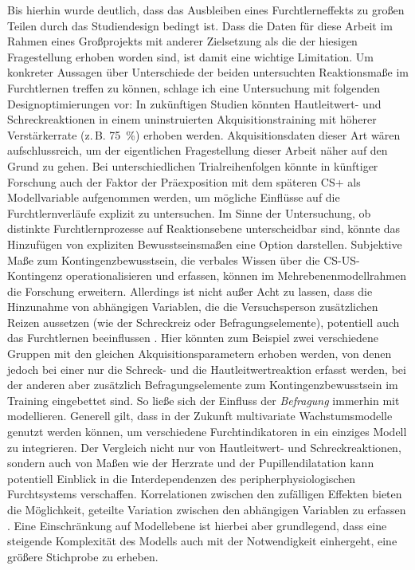 	Bis hierhin wurde deutlich, dass das Ausbleiben eines Furchtlerneffekts zu großen Teilen durch das Studiendesign bedingt ist. 
	Dass die Daten für diese Arbeit im Rahmen eines Großprojekts mit anderer Zielsetzung als die der hiesigen Fragestellung erhoben worden sind, ist damit eine wichtige Limitation. 
	Um konkreter Aussagen über Unterschiede der beiden untersuchten Reaktionsmaße im Furchtlernen treffen zu können, schlage ich eine Untersuchung mit folgenden Designoptimierungen vor: 
	In zukünftigen Studien könnten Hautleitwert- und Schreckreaktionen in einem uninstruierten Akquisitionstraining mit höherer Verstärkerrate (z.\,B. \SI{75}{\percent}) erhoben werden. 
	Akquisitionsdaten dieser Art wären aufschlussreich, um der eigentlichen Fragestellung dieser Arbeit näher auf den Grund zu gehen.
	Bei unterschiedlichen Trialreihenfolgen könnte in künftiger Forschung auch der Faktor der Präexposition mit dem späteren CS+ als Modellvariable  aufgenommen werden, um mögliche Einflüsse auf die Furchtlernverläufe explizit zu untersuchen.
	Im Sinne der Untersuchung, ob distinkte Furchtlernprozesse auf Reaktionsebene unterscheidbar sind, könnte das Hinzufügen von expliziten Bewusstseinsmaßen eine Option darstellen. Subjektive Maße zum Kontingenzbewusstsein, die verbales Wissen über die CS-US-Kontingenz operationalisieren und erfassen, können im Mehrebenenmodellrahmen die Forschung erweitern. Allerdings ist nicht außer Acht zu lassen, dass die Hinzunahme von abhängigen Variablen, die die Versuchsperson zusätzlichen Reizen aussetzen (wie der Schreckreiz oder Befragungselemente), potentiell auch das Furchtlernen beeinflussen \parencite[am Beispiel des Schreckreizes:][]{SJOUWERMAN2016}.
	Hier könnten zum Beispiel zwei verschiedene Gruppen mit den gleichen Akquisitionsparametern erhoben werden, von denen jedoch bei einer nur die Schreck- und die Hautleitwertreaktion erfasst werden, bei der anderen aber  zusätzlich Befragungselemente zum Kontingenzbewusstsein im Training eingebettet sind. So ließe sich der Einfluss der \textit{Befragung} immerhin mit modellieren.   
	Generell gilt, dass in der Zukunft multivariate Wachstumsmodelle genutzt werden können, um verschiedene Furchtindikatoren in ein einziges Modell zu integrieren. Der Vergleich nicht nur von Hautleitwert- und Schreckreaktionen, sondern auch von Maßen wie der Herzrate und der Pupillendilatation kann potentiell Einblick in die Interdependenzen des peripherphysiologischen Furchtsystems verschaffen. Korrelationen zwischen den zufälligen Effekten bieten die Möglichkeit, geteilte Variation zwischen den abhängigen Variablen zu erfassen \parencite[][]{CURRAN2012,MACCALLUM1997}. 
	Eine Einschränkung auf Modellebene ist hierbei aber grundlegend, dass eine steigende Komplexität des Modells auch mit der Notwendigkeit einhergeht, eine größere Stichprobe zu erheben.   
		

